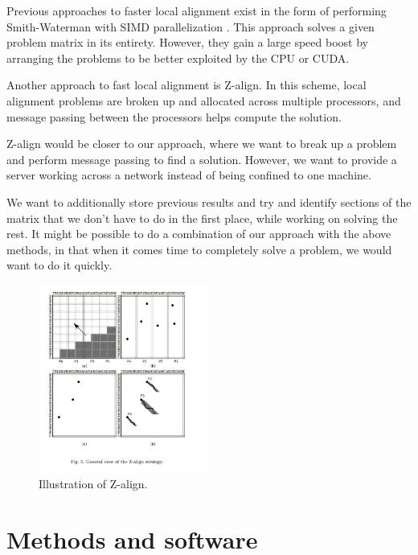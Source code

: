 \documentclass[12pt]{article}
\begin{document}
Previous approaches to faster local alignment exist in the form of performing Smith-Waterman with SIMD parallelization \cite{Rognes:11}. This approach solves a given problem matrix in its entirety. However, they gain a large speed boost by arranging the problems to be better exploited by the CPU or CUDA. 

Another approach to fast local alignment is Z-align\cite{Boukerche:12}. In this scheme, local alignment problems are broken up and allocated across multiple processors, and message passing between the processors helps compute the solution.

Z-align would be closer to our approach, where we want to break up a problem and perform message passing to find a solution. However, we want to provide a server working across a network instead of being confined to one machine.  

We want to additionally store previous results and try and identify sections of the matrix that we don't have to do in the first place, while working on solving the rest. It might be possible to do a combination of our approach with the above methods, in that when it comes time to completely solve a problem, we would want to do it quickly.

\begin{figure}
  \centering 
  \includegraphics[width=0.5\textwidth]{ExistingWorkAllocationStrategies}
  \caption{Illustration of Z-align.\cite{Rognes:11}}
  \label{fig:z-align}
\end{figure}



\section{Methods and software}
\end{document}
